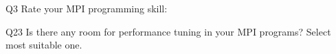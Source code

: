 \begin{description}%
\item{Q3} Rate your MPI programming skill:%
\item{Q23} Is there any room for performance tuning in your MPI programs? Select most suitable one.%
\end{description}%
